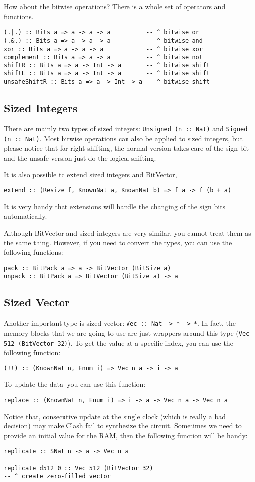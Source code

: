 How about the bitwise operations? There is a whole set of operators and functions.
\begin{verbatim}
(.|.) :: Bits a => a -> a -> a          -- ^ bitwise or
(.&.) :: Bits a => a -> a -> a          -- ^ bitwise and
xor :: Bits a => a -> a -> a            -- ^ bitwise xor
complement :: Bits a => a -> a          -- ^ bitwise not
shiftR :: Bits a => a -> Int -> a       -- ^ bitwise shift
shiftL :: Bits a => a -> Int -> a       -- ^ bitwise shift
unsafeShiftR :: Bits a => a -> Int -> a -- ^ bitwise shift
\end{verbatim}
\subsection{Sized Integers}
There are mainly two types of sized integers: \texttt{Unsigned (n :: Nat)} and
\texttt{Signed (n :: Nat)}. Most bitwise operations can also be applied to sized integers, but please notice that for right shifting, the normal version takes care of the sign bit and the unsafe version just do the logical shifting.

It is also possible to extend sized integers and BitVector,
\begin{verbatim}
extend :: (Resize f, KnownNat a, KnownNat b) => f a -> f (b + a)
\end{verbatim}
It is very handy that extensions will handle the changing of the sign bits automatically.

Although BitVector and sized integers are very similar, you cannot treat them as the same thing. However, if you need to convert the types, you can use the following functions:
\begin{verbatim}
pack :: BitPack a => a -> BitVector (BitSize a)
unpack :: BitPack a => BitVector (BitSize a) -> a
\end{verbatim}
\subsection{Sized Vector}
Another important type is sized vector: \texttt{Vec :: Nat -> * -> *}. In fact, the memory blocks that we are going to use are just wrappers around this type (\texttt{Vec 512 (BitVector 32)}).
To get the value at a specific index, you can use the following function:
\begin{verbatim}
(!!) :: (KnownNat n, Enum i) => Vec n a -> i -> a
\end{verbatim}
To update the data, you can use this function:
\begin{verbatim}
replace :: (KnownNat n, Enum i) => i -> a -> Vec n a -> Vec n a
\end{verbatim}
Notice that, consecutive update at the single clock (which is really a bad decision) may make Clash fail to synthesize the circuit.
Sometimes we need to provide an initial value for the RAM, then
the following function will be handy:
\begin{verbatim}
replicate :: SNat n -> a -> Vec n a

replicate d512 0 :: Vec 512 (BitVector 32) 
-- ^ create zero-filled vector
\end{verbatim}
